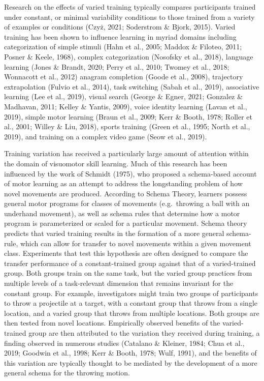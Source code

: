 \documentclass[
  man,floatsintext]{apa7}
\begin{document}
Research on the effects of varied training typically compares participants trained under constant, or minimal variability conditions to those trained from a variety of examples or conditions (Czyż, 2021; Soderstrom \& Bjork, 2015). Varied training has been shown to influence learning in myriad domains including categorization of simple stimuli (Hahn et al., 2005; Maddox \& Filoteo, 2011; Posner \& Keele, 1968), complex categorization (Nosofsky et al., 2018), language learning (Jones \& Brandt, 2020; Perry et al., 2010; Twomey et al., 2018; Wonnacott et al., 2012) anagram completion (Goode et al., 2008), trajectory extrapolation (Fulvio et al., 2014), task switching (Sabah et al., 2019), associative learning (Lee et al., 2019), visual search (George \& Egner, 2021; Gonzalez \& Madhavan, 2011; Kelley \& Yantis, 2009), voice identity learning (Lavan et al., 2019), simple motor learning (Braun et al., 2009; Kerr \& Booth, 1978; Roller et al., 2001; Willey \& Liu, 2018), sports training (Green et al., 1995; North et al., 2019), and training on a complex video game (Seow et al., 2019).

Training variation has received a particularly large amount of attention within the domain of visuomotor skill learning. Much of this research has been influenced by the work of Schmidt (1975), who proposed a schema-based account of motor learning as an attempt to address the longstanding problem of how novel movements are produced. According to Schema Theory, learners possess general motor programs for classes of movements (e.g.~throwing a ball with an underhand movement), as well as schema rules that determine how a motor program is parameterized or scaled for a particular movement. Schema theory predicts that varied training results in the formation of a more general schema-rule, which can allow for transfer to novel movements within a given movement class. Experiments that test this hypothesis are often designed to compare the transfer performance of a constant-trained group against that of a varied-trained group. Both groups train on the same task, but the varied group practices from multiple levels of a task-relevant dimension that remains invariant for the constant group. For example, investigators might train two groups of participants to throw a projectile at a target, with a constant group that throws from a single location, and a varied group that throws from multiple locations. Both groups are then tested from novel locations. Empirically observed benefits of the varied-trained group are then attributed to the variation they received during training, a finding observed in numerous studies (Catalano \& Kleiner, 1984; Chua et al., 2019; Goodwin et al., 1998; Kerr \& Booth, 1978; Wulf, 1991), and the benefits of this variation are typically thought to be mediated by the development of a more general schema for the throwing motion.
\end{document}
